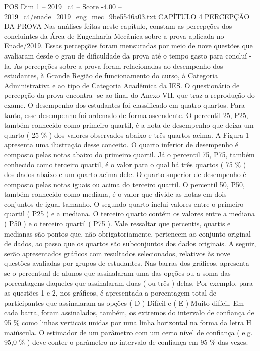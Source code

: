 \begin{textsample}{POS Dim 1 – 2019\_c4 – Score -4.00 – 2019\_c4/enade\_2019\_eng\_mec\_9be5546a03.txt}  \label{ex:f1_pos_350}
CAPÍTULO 4 PERCEPÇÃO DA PROVA Nas análises feitas neste capítulo, constam as percepções dos concluintes da Área de Engenharia Mecânica sobre a prova aplicada no Enade/2019.
Essas percepções foram mensuradas por meio de nove questões que avaliaram desde o grau de dificuldade da prova até o tempo gasto para concluí -la.
As percepções sobre a prova foram relacionadas ao desempenho dos estudantes, à Grande Região de funcionamento do curso, à Categoria Administrativa e ao tipo de Categoria Acadêmica da IES.
O questionário de percepção da prova encontra -se ao final do Anexo VII, que traz a reprodução do exame.
O desempenho dos estudantes foi classificado em quatro quartos.
Para tanto, esse desempenho foi ordenado de forma ascendente.
O percentil 25, P25, também conhecido como primeiro quartil, é a nota de desempenho que deixa um quarto ( 25 \% ) dos valores observados abaixo e três quartos acima.
A Figura 1 apresenta uma ilustração desse conceito.
O quarto inferior de desempenho é composto pelas notas abaixo do primeiro quartil.
Já o percentil 75, P75, também conhecido como terceiro quartil, é o valor para o qual há três quartos ( 75 \% ) dos dados abaixo e um quarto acima dele.
O quarto superior de desempenho é composto pelas notas iguais ou acima do terceiro quartil.
O percentil 50, P50, também conhecido como mediana, é o valor que divide as notas em dois conjuntos de igual tamanho.
O segundo quarto inclui valores entre o primeiro quartil ( P25 ) e a mediana.
O terceiro quarto contém os valores entre a mediana ( P50 ) e o terceiro quartil ( P75 ).
Vale ressaltar que percentis, quartis e medianas são pontos que, não obrigatoriamente, pertencem ao conjunto original de dados, ao passo que os quartos são subconjuntos dos dados originais.
A seguir, serão apresentados gráficos com resultados selecionados, relativos às nove questões avaliadas por grupos de estudantes.
Nas barras dos gráficos, apresenta -se o percentual de alunos que assinalaram uma das opções ou a soma das porcentagens daqueles que assinalaram duas ( ou três ) delas.
Por exemplo, para as questões 1 e 2, nos gráficos, é apresentada a porcentagem total de participantes que assinalaram as opções ( D ) Difícil e ( E ) Muito difícil.
Em cada barra, foram assinalados, também, os extremos do intervalo de confiança de 95 \% como linhas verticais unidas por uma linha horizontal na forma da letra H maiúscula.
O estimador de um parâmetro com um certo nível de confiança ( e.g. 95,0 \% ) deve conter o parâmetro no intervalo de confiança em 95 \% das vezes.

\end{textsample}
